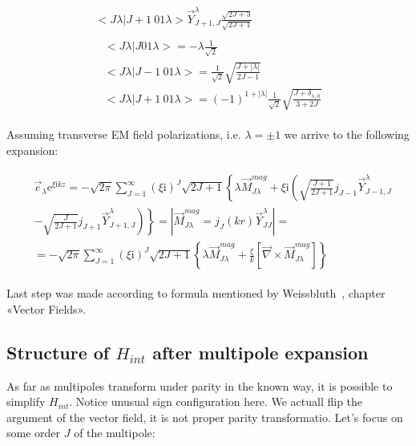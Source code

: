 \begin{align}
\begin{split}
            <J \lambda|J+1~0 1 \lambda> \vec{Y}^\lambda_{J+1,J}
            \frac{\sqrt{2J+3}}{\sqrt{2J+1}}
    \end{split}\\
    \begin{split}
        &<J \lambda|J 0 1 \lambda> = -\lambda \frac{1}{\sqrt{2}} \\
        &<J \lambda|J-1~0 1 \lambda> = \frac{1}{\sqrt{2}}
            \sqrt{\frac{J + |\lambda|}{2J-1}} \\
        &<J \lambda | J+1~0 1 \lambda>  = (-1)^{1 + |\lambda|}
            \frac{1}{\sqrt{2}} \sqrt{\frac{J + \delta_{\lambda, 0}}{3 + 2J}}
    \end{split}
\end{align}

Assuming transverse EM field polarizations, i.e.  $\lambda = \pm 1$
we arrive to the following expansion:

\begin{align}
    \begin{split}
        &\vec{e}_{\lambda} \mathrm{e}^{\xi \mathrm{i} k z} =
            -\sqrt{2 \pi} \sum_{J=1}^{\infty} (\xi \mathrm{i})^J \sqrt{2J +1}
            \left\{ \lambda \vec{M}^{mag}_{J\lambda} + \xi \mathrm{i}
            \left( \sqrt{\frac{J+1}{2J+1}} j_{J-1} \vec{Y}^\lambda_{J-1, J} \right. \right. \\
            &\left. \left. -\sqrt{\frac{J}{2J+1}} j_{J+1} \vec{Y}^\lambda_{J+1, J} \right) \right\} = \left| \vec{M}^{mag}_{J \lambda} = j_{J}(kr)
            \vec{Y}^\lambda_{J J} \right| = \\
            &= -\sqrt{2 \pi} \sum_{J=1}^{\infty}
            (\xi \mathrm{i})^J \sqrt{2J +1} \left\{ \lambda \vec{M}^{mag}_{J \lambda}
            +\frac{\xi}{k} \left[ \vec{\nabla} \times
            \vec{M}^{mag}_{J \lambda} \right] \right\}
    \end{split}
\end{align}

Last step was made according to formula mentioned by Weissbluth~\cite{weissbluth}, chapter «Vector Fields».

\subsection*{Structure of $H_{int}$ after multipole expansion}

As far as multipoles transform under parity in the known way, it is possible to simplify $H_{int}$. Notice unusual sign configuration here. We actuall flip the argument of the vector field, it is not proper parity transformatio. Let's focus on some order $J$ of the multipole:

